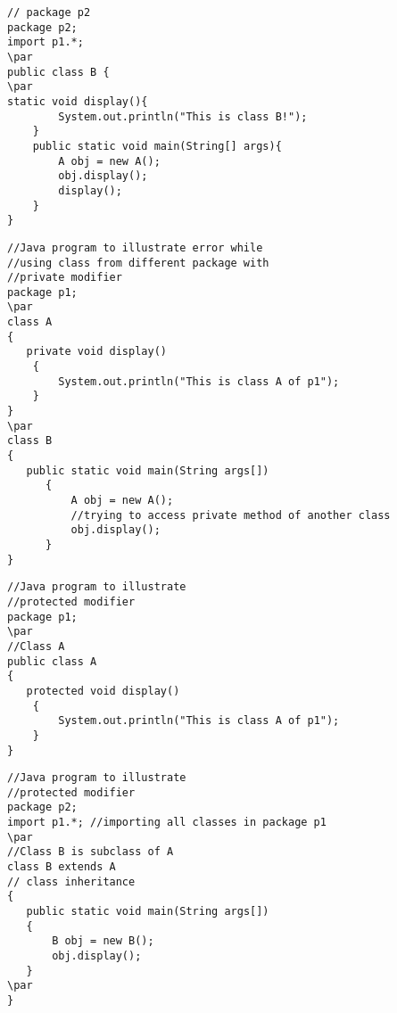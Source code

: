 \documentclass{book}
\def\lthtmlcheckvsize{\ifdim\ht\sizebox<\vsize 
  \ifdim\wd\sizebox<\hsize\expandafter\hfill\fi \expandafter\vfill
  \else\expandafter\vss\fi}%
\begin{document}
{\newpage\clearpage
{}%
\begin{lstlisting}
// package p2 
package p2;
import p1.*;
\par
public class B {
\par
static void display(){
		System.out.println("This is class B!");
	}
	public static void main(String[] args){
		A obj = new A();
		obj.display();
		display();
	}
}
\end{lstlisting}%
\lthtmlfigureZ
\lthtmlcheckvsize\clearpage}

{\newpage\clearpage
{}%
\begin{lstlisting}
//Java program to illustrate error while  
//using class from different package with 
//private modifier 
package p1; 
\par
class A 
{ 
   private void display() 
    { 
        System.out.println("This is class A of p1"); 
    } 
} 
\par
class B 
{ 
   public static void main(String args[]) 
      { 
          A obj = new A(); 
          //trying to access private method of another class 
          obj.display(); 
      } 
} 
\end{lstlisting}%
\lthtmlfigureZ
\lthtmlcheckvsize\clearpage}

{\newpage\clearpage
{}%
\begin{lstlisting}
//Java program to illustrate 
//protected modifier 
package p1; 
\par
//Class A 
public class A 
{ 
   protected void display() 
    { 
        System.out.println("This is class A of p1"); 
    } 
}
\end{lstlisting}%
\lthtmlfigureZ
\lthtmlcheckvsize\clearpage}

{\newpage\clearpage
{}%
\begin{lstlisting}
//Java program to illustrate 
//protected modifier 
package p2; 
import p1.*; //importing all classes in package p1 
\par
//Class B is subclass of A 
class B extends A 
// class inheritance
{ 
   public static void main(String args[]) 
   {   
       B obj = new B();   
       obj.display();   
   }   
\par
} 
\end{lstlisting}%
\lthtmlfigureZ
\lthtmlcheckvsize\clearpage}
\end{document}
